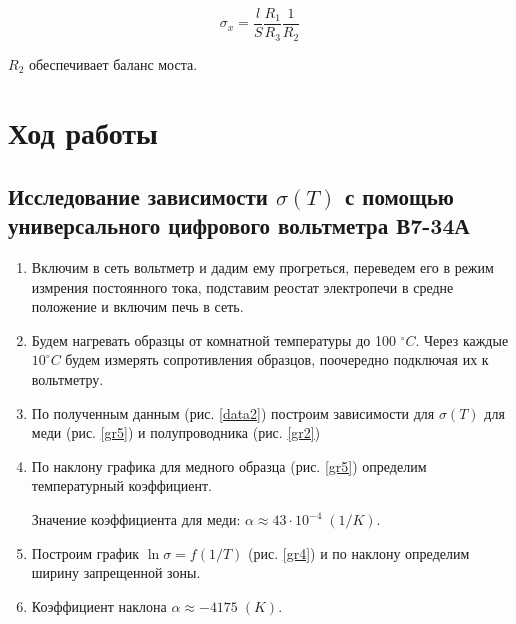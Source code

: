 \documentclass[a4paper]{article}
\begin{document}
\begin{equation}
    \sigma_x = \frac{l}{S} \frac{R_1}{R_3} \frac{1}{R_2}
\end{equation}

$R_2$ обеспечивает баланс моста. 




\section{Ход работы}


\subsection{Исследование зависимости $\sigma(T)$ с помощью универсального цифрового вольтметра В7-34А}

\begin{enumerate}
    \item Включим в сеть вольтметр и дадим ему прогреться, переведем его в режим измрения постоянного тока, подставим 
    реостат электропечи в средне положение и включим печь в сеть.

    \item Будем нагревать образцы от комнатной температуры до 100 $^{\circ} C$. Через каждые $10 ^{\circ} C$ будем измерять сопротивления образцов, поочередно подключая их к вольтметру. 
    \item По полученным данным (рис. \ref{data2}) построим зависимости для $\sigma(T)$ для меди (рис. \ref{gr5}) и полупроводника (рис. \ref{gr2})
    \item По наклону графика для медного образца (рис. \ref{gr5}) определим температурный коэффициент. 

    \begin{center}
    \end{center}

    Значение коэффициента для меди: $\alpha \approx 43 \cdot 10^{-4} \; (1/K)$.
 
    \item Построим график $\ln{\sigma} = f(1/T)$ (рис. \ref{gr4}) и по наклону определим ширину запрещенной зоны.
    \item Коэффициент наклона $\alpha \approx -4175 \;(K)$.

        \begin{center}
        \end{center}
        

\end{enumerate}
\end{document}
